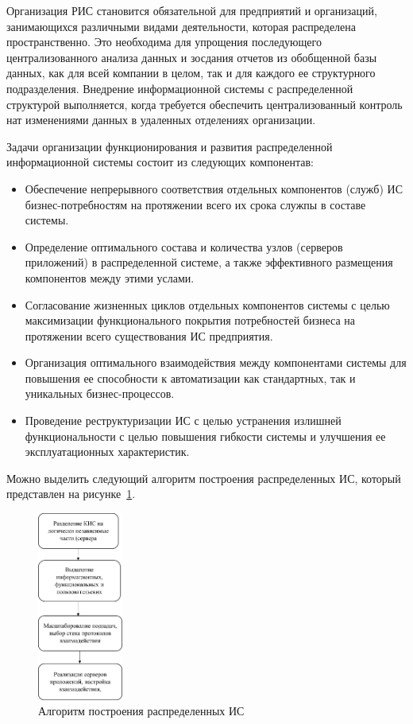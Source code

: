 \documentclass[report, draught]{fefudoc}
\begin{document}
Организация РИС становится обязательной для предприятий и организаций, занимающихся различными видами деятельности, которая распределена пространственно. Это необходима для упрощения последующего централизованного анализа данных и зосдания отчетов из обобщенной базы данных, как для всей компании в целом, так и для каждого ее структурного подразделения. Внедрение информационной системы с распределенной структурой выполняется, когда требуется обеспечить централизованный контроль нат изменениями данных в удаленных отделениях организации.

Задачи организации функционирования и развития распределенной информационной системы состоит из следующих компонентав:
\begin{itemize}
\item Обеспечение непрерывного соответствия отдельных компонентов (служб) ИС бизнес-потребностям на протяжении всего их срока служпы в составе системы.
\item Определение оптимального состава и количества узлов (серверов приложений) в распределенной системе, а также эффективного размещения компонентов между этими услами.
\item Согласование жизненных циклов отдельных компонентов системы с целью максимизации функционального покрытия потребностей бизнеса на протяжении всего существования ИС предприятия.
\item Организация оптимального взаимодействия между компонентами системы для повышения ее способности к автоматизации как стандартных, так и уникальных бизнес-процессов.
\item Проведение реструктуризации ИС с целью устранения излишней функциональности с целью повышения гибкости системы и улучшения ее эксплуатационных характеристик.
\end{itemize}

Можно выделить следующий алгоритм построения распределенных ИС, который представлен на рисунке~\ref{fig_algo}.

\begin{figure}
\centering
\includegraphics[width=0.25\textwidth]{1}
\caption{Алгоритм построения распределенных ИС}
\label{fig_algo}
\end{figure}
\end{document}
